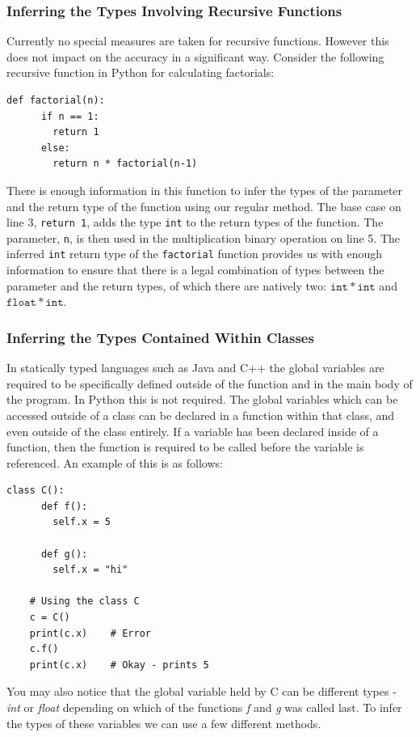 \documentclass[12pt, titlepage]{article}
\begin{document}
\subsubsection{Inferring the Types Involving Recursive Functions}
Currently no special measures are taken for recursive functions. However this does not impact on the accuracy in a significant way. Consider the following recursive function in Python for calculating factorials:
\begin{lstlisting}[mathescape]
    def factorial(n):
      if n == 1:
        return 1
      else:
        return n * factorial(n-1)
\end{lstlisting}
There is enough information in this function to infer the types of the parameter and the return type of the function using our regular method. The base case on line 3, \texttt{return 1}, adds the type \texttt{int} to the return types of the function. The parameter, \texttt{n}, is then used in the multiplication binary operation on line 5. The inferred \texttt{int} return type of the \texttt{factorial} function provides us with enough information to ensure that there is a legal combination of types between the parameter and the return types, of which there are natively two: $\mathtt{int * int}$ and $\mathtt{float * int}$.


\subsubsection{Inferring the Types Contained Within Classes}
In statically typed languages such as Java and C++ the global variables are required to be specifically defined outside of the function and in the main body of the program. In Python this is not required. The global variables which can be accessed outside of a class can be declared in a function within that class, and even outside of the class entirely. If a variable has been declared inside of a function, then the function is required to be called before the variable is referenced. An example of this is as follows:
\begin{lstlisting}[mathescape]
    class C():
      def f():
        self.x = 5
		
      def g():
        self.x = "hi"
        
    # Using the class C
    c = C()
    print(c.x)    # Error
    c.f()
    print(c.x)    # Okay - prints 5
\end{lstlisting}
You may also notice that the global variable held by C can be different types - \textit{int} or \textit{float} depending on which of the functions \textit{f} and \textit{g} was called last. To infer the types of these variables we can use a few different methods.
\end{document}
